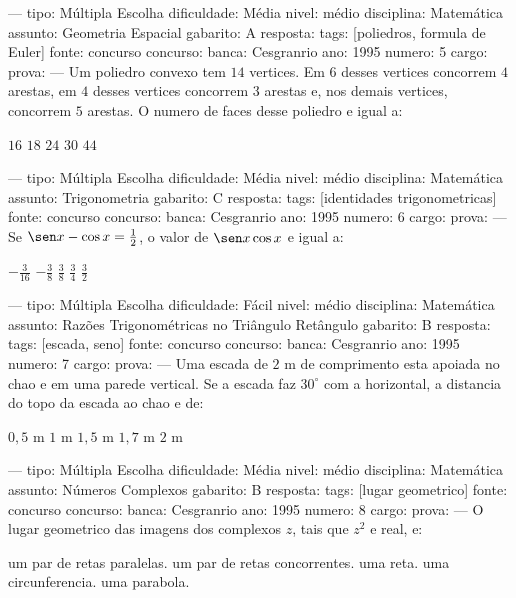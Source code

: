 ---
tipo: Múltipla Escolha
dificuldade: Média
nivel: médio
disciplina: Matemática
assunto: Geometria Espacial
gabarito: A
resposta:
tags: [poliedros, formula de Euler]
fonte: concurso
concurso:
banca: Cesgranrio
ano: 1995
numero: 5
cargo:
prova:
---
\question
Um poliedro convexo tem $14$ vertices. Em $6$ desses vertices concorrem $4$ arestas, em $4$ desses vertices concorrem $3$ arestas e, nos demais vertices, concorrem $5$ arestas. O numero de faces desse poliedro e igual a:
\begin{choices}
\CorrectChoice $16$
\choice $18$
\choice $24$
\choice $30$
\choice $44$
\end{choices}

---
tipo: Múltipla Escolha
dificuldade: Média
nivel: médio
disciplina: Matemática
assunto: Trigonometria
gabarito: C
resposta:
tags: [identidades trigonometricas]
fonte: concurso
concurso:
banca: Cesgranrio
ano: 1995
numero: 6
cargo:
prova:
---
\question
Se $\sen x - \cos x = \frac{1}{2}$, o valor de $\sen x \cos x$ e igual a:
\begin{choices}
\choice $-\frac{3}{16}$
\choice $-\frac{3}{8}$
\CorrectChoice $\frac{3}{8}$
\choice $\frac{3}{4}$
\choice $\frac{3}{2}$
\end{choices}

---
tipo: Múltipla Escolha
dificuldade: Fácil
nivel: médio
disciplina: Matemática
assunto: Razões Trigonométricas no Triângulo Retângulo
gabarito: B
resposta:
tags: [escada, seno]
fonte: concurso
concurso:
banca: Cesgranrio
ano: 1995
numero: 7
cargo:
prova:
---
\question
Uma escada de $2$ m de comprimento esta apoiada no chao e em uma parede vertical. Se a escada faz $30^\circ$ com a horizontal, a distancia do topo da escada ao chao e de:
\begin{choices}
\choice $0,5$ m
\CorrectChoice $1$ m
\choice $1,5$ m
\choice $1,7$ m
\choice $2$ m
\end{choices}

---
tipo: Múltipla Escolha
dificuldade: Média
nivel: médio
disciplina: Matemática
assunto: Números Complexos
gabarito: B
resposta:
tags: [lugar geometrico]
fonte: concurso
concurso:
banca: Cesgranrio
ano: 1995
numero: 8
cargo:
prova:
---
\question
O lugar geometrico das imagens dos complexos $z$, tais que $z^2$ e real, e:
\begin{choices}
\choice um par de retas paralelas.
\CorrectChoice um par de retas concorrentes.
\choice uma reta.
\choice uma circunferencia.
\choice uma parabola.
\end{choices}

